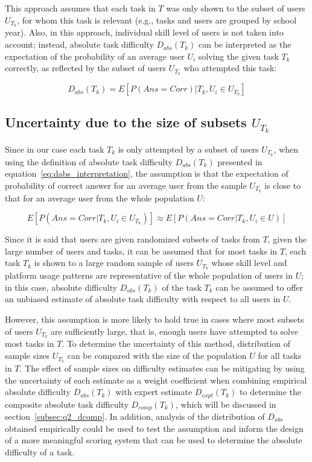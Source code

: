 This approach assumes that each task in $T$ was only shown to the subset of users $U_{T_k}$, for whom this task is relevant (e.g., tasks and users are grouped by school year).
Also, in this approach, individual skill level of users is not taken into account;
instead, absolute task difficulty $D_{abs}(T_k)$ can be interpreted as the expectation of the probability of an average user $U_i$ solving the given task $T_k$ correctly, as reflected by the subset of users $U_{T_k}$ who attempted this task:

\begin{equation} \label{eq:dabs_interpretation}
    D_{abs}(T_k) = E[P(Ans=Corr)|T_k, U_i \in U_{T_k}]
\end{equation}

\subsection{Uncertainty due to the size of subsets $U_{T_k}$} \label{subsec:q1_dabs_uncertainty}

Since in our case each task $T_k$ is only attempted by a subset of users $U_{T_k}$, when using the definition of absolute task difficulty $D_{abs}(T_k)$ presented in equation~\ref{eq:dabs_interpretation}, the assumption is that the expectation of probability of correct answer for an average user from the sample $U_{T_k}$ is close to that for an average user from the whole population $U$:

\begin{equation} \label{eq:dabs_assumption}
    E[P(Ans=Corr|T_k, U_i \in U_{T_k})] \approx E[P(Ans=Corr|T_k, U_i \in U)]
\end{equation}

Since it is said that users are given randomized subsets of tasks from $T$, given the large number of users and tasks, it can be assumed that for most tasks in $T$, each task $T_k$ is shown to a large random sample of users $U_{T_k}$ whose skill level and platform usage patterns are representative of the whole population of users in $U$;
in this case, absolute difficulty $D_{abs}(T_k)$ of the task $T_k$ can be assumed to offer an unbiased estimate of absolute task difficulty with respect to all users in $U$.

However, this assumption is more likely to hold true in cases where most subsets of users $U_{T_k}$ are sufficiently large, that is, enough users have attempted to solve most tasks in $T$.
To determine the uncertainty of this method, distribution of sample sizes $U_{T_k}$ can be compared with the size of the population $U$ for all tasks in $T$.
The effect of sample sizes on difficulty estimates can be mitigating by using the uncertainty of each estimate as a weight coefficient when combining empirical absolute difficulty $D_{abs}(T_k)$ with expert estimate $D_{expt}(T_k)$ to determine the composite absolute task difficulty $D_{comp}(T_k)$, which will be discussed in section~\ref{subsec:q2_dcomp}.
In addition, analysis of the distribution of $D_{abs}$ obtained empirically could be used to test the assumption and inform the design of a more meaningful scoring system that can be used to determine the absolute difficulty of a task.

